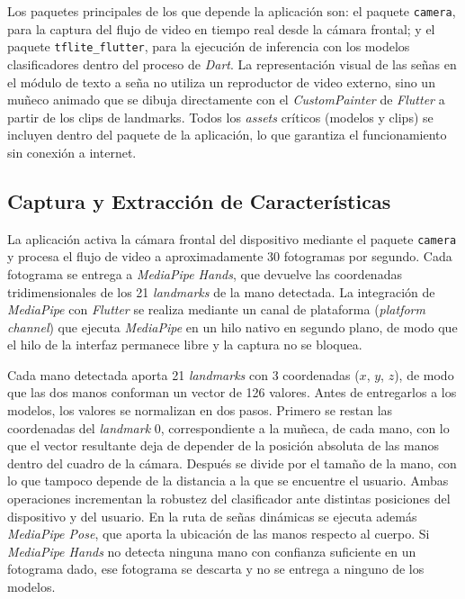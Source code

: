 Los paquetes principales de los que depende la aplicación son: el paquete
\texttt{camera}, para la captura del flujo de video en tiempo real desde la cámara
frontal; y el paquete \texttt{tflite\_flutter}, para la ejecución de inferencia con los
modelos clasificadores dentro del proceso de \textit{Dart}. La representación visual de
las señas en el módulo de texto a seña no utiliza un reproductor de video externo, sino
un muñeco animado que se dibuja directamente con el \textit{CustomPainter} de
\textit{Flutter} a partir de los clips de landmarks. Todos los \textit{assets} críticos
(modelos y clips) se incluyen dentro del paquete de la aplicación, lo que garantiza el
funcionamiento sin conexión a internet.

\subsection{Captura y Extracción de Características}
\label{sec:captura-landmarks}

La aplicación activa la cámara frontal del dispositivo mediante el paquete
\texttt{camera} y procesa el flujo de video a aproximadamente 30 fotogramas por
segundo. Cada fotograma se entrega a \textit{MediaPipe Hands}, que devuelve las
coordenadas tridimensionales de los 21 \textit{landmarks} de la mano detectada.
La integración de \textit{MediaPipe} con \textit{Flutter} se realiza mediante un
canal de plataforma (\textit{platform channel}) que ejecuta \textit{MediaPipe} en un
hilo nativo en segundo plano, de modo que el hilo de la interfaz permanece libre y la
captura no se bloquea.

Cada mano detectada aporta 21 \textit{landmarks} con 3 coordenadas ($x$, $y$, $z$), de
modo que las dos manos conforman un vector de 126 valores. Antes de entregarlos a los
modelos, los valores se normalizan en dos pasos. Primero se restan las coordenadas del
\textit{landmark} 0, correspondiente a la muñeca, de cada mano, con lo que el vector
resultante deja de depender de la posición absoluta de las manos dentro del cuadro de la
cámara. Después se divide por el tamaño de la mano, con lo que tampoco depende de la
distancia a la que se encuentre el usuario. Ambas operaciones incrementan la robustez del
clasificador ante distintas posiciones del dispositivo y del usuario. En la ruta de señas dinámicas se ejecuta además
\textit{MediaPipe Pose}, que aporta la ubicación de las manos respecto al cuerpo. Si
\textit{MediaPipe Hands} no detecta ninguna mano con confianza suficiente en un
fotograma dado, ese fotograma se descarta y no se entrega a ninguno de los modelos.

